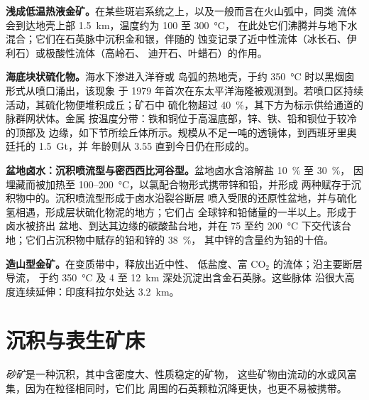 \textbf{浅成低温热液金矿。}在某些斑岩系统之上，以及一般而言在火山弧中，同类
流体会到达地壳上部 \qty{1.5}{km}，温度约为 100 至 \qty{300}{\celsius}，
在此处它们沸腾并与地下水混合；它们在石英脉中沉积金和银，伴随的
蚀变记录了近中性流体（冰长石、伊利石）或极酸性流体（高岭石、
迪开石、叶蜡石）的作用。

\textbf{海底块状硫化物。}海水下渗进入洋脊或
岛弧的热地壳，于约 \qty{350}{\celsius} 时以黑烟囱形式从喷口涌出，该现象
于 1979 年首次在东太平洋海隆被观测到。若喷口区持续活动，其硫化物便堆积成丘；矿石中
硫化物超过 \qty{40}{\percent}，其下方为标示供给通道的脉群网状体。金属
按温度分带：铁和铜位于高温底部，锌、铁、铅和钡位于较冷的顶部及
边缘，如下节所绘丘体所示。规模从不足一吨的透镜体，到西班牙里奥廷托的 \qty{1.5}{Gt}，并
年龄则从 \qty{3.55}{\Ga} 直到今日仍在形成的。

\textbf{盆地卤水：沉积喷流型与密西西比河谷型。}盆地卤水含溶解盐 \qty{10}{\percent} 至 \qty{30}{\percent}，
因埋藏而被加热至 100--\qty{200}{\celsius}，以氯配合物形式携带锌和铅，并形成
两种赋存于沉积物中的。沉积喷流型形成于卤水沿裂谷断层
喷入受限的还原性盆地，并与硫化氢相遇，形成层状硫化物泥的地方；它们占
全球锌和铅储量的一半以上。形成于卤水被挤出
盆地、到达其边缘的碳酸盐台地，并在 75 至约
\qty{200}{\celsius} 下交代该台地；它们占沉积物中赋存的铅和锌的 \qty{38}{\percent}，
其中锌的含量约为铅的十倍。

\textbf{造山型金矿。}在变质带中，释放出近中性、
低盐度、富 CO$_2$ 的流体；沿主要断层导流，
于约 \qty{350}{\celsius} 及 4 至 \qty{12}{km} 深处沉淀出含金石英脉。这些脉体
沿很大高度连续延伸：印度科拉尔处达 \qty{3.2}{km}。

\section{沉积与表生矿床}\label{sec:b2:ore-deposits:sedimentary}

\begin{definition}[砂矿]\label{def:b2:ore-deposits:placer}
\emph{砂矿}是一种沉积，其中含密度大、性质稳定的矿物，
这些矿物由流动的水或风富集，因为在粒径相同时，它们比
周围的石英颗粒沉降更快，也更不易被携带。
\end{definition}


